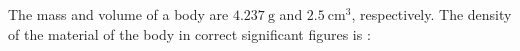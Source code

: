 The mass and volume of a body are $4.237 \ \text{g}$ and $2.5 \ \text{cm}^3$, 
respectively. The density of the material of the body in
correct significant figures is :
